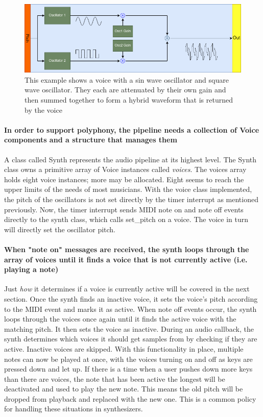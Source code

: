 \documentclass[acmlarge,screen]{acmart}
\begin{document}
	\begin{figure}[H]
		\includegraphics[width=\linewidth]{simple_voice}
		\caption{This example shows a voice with a sin wave oscillator and square wave oscillator. They each are attenuated by their own gain and then summed together to form a hybrid waveform that is returned by the voice}
		\centering
	\end{figure}
	
	\paragraph{In order to support polyphony, the pipeline needs a collection of Voice components and a structure that manages them} A class called Synth represents the audio pipeline at its highest level. The Synth class owns a primitive array of Voice instances called \textit{voices}. The voices array holds eight voice instances; more may be allocated. Eight seems to reach the upper limits of the needs of most musicians. With the voice class implemented, the pitch of the oscillators is not set directly by the timer interrupt as mentioned previously. Now, the timer interrupt sends MIDI note on and note off events directly to the synth class, which calls set\_pitch on a voice. The voice in turn will directly set the oscillator pitch.
	
	\paragraph{When "note on" messages are received, the synth loops through the array of voices until it finds a voice that is not currently active (i.e. playing a note)} Just \textit{how} it determines if a voice is currently active will be covered in the next section. Once the synth finds an inactive voice, it sets the voice's pitch according to the MIDI event and marks it as active. When note off events occur, the synth loops through the voices once again until it finds the active voice with the matching pitch. It then sets the voice as inactive. During an audio callback, the synth determines which voices it should get samples from by checking if they are active. Inactive voices are skipped. With this functionality in place, multiple notes can now be played at once, with the voices turning on and off as keys are pressed down and let up. If there is a time when a user pushes down more keys than there are voices, the note that has been active the longest will be deactivated and used to play the new note. This means the old pitch will be dropped from playback and replaced with the new one. This is a common policy for handling these situations in synthesizers.
	
\end{document}
